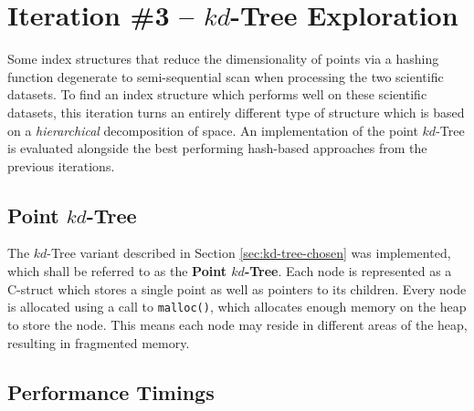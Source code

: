\section{Iteration \#3 -- $kd$-Tree Exploration}

Some index structures that reduce the dimensionality of points via a hashing function degenerate to semi-sequential scan when processing the two scientific datasets. To find an index structure which performs well on these scientific datasets, this iteration turns an entirely different type of structure which is based on a \textit{hierarchical} decomposition of space. An implementation of the point $kd$-Tree is evaluated alongside the best performing hash-based approaches from the previous iterations.

\subsection{Point $kd$-Tree}

The $kd$-Tree variant described in Section \ref{sec:kd-tree-chosen} was implemented, which shall be referred to as the \textbf{Point $kd$-Tree}. Each node is represented as a C-struct which stores a single point as well as pointers to its children. Every node is allocated using a call to \texttt{malloc()}, which allocates enough memory on the heap to store the node. This means each node may reside in different areas of the heap, resulting in fragmented memory.

\subsection{Performance Timings}

